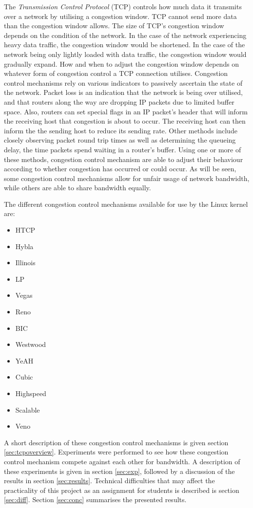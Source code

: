 \documentclass[11pt,a4paper,twocolumn]{article}
\begin{document}
The \textit{Transmission Control Protocol} (TCP) controls how much data it transmits over a network by utilising
a congestion window. TCP cannot send more data than the congestion window allows. The size of TCP's congestion
window depends on the condition of the network. In the case of the network experiencing heavy data traffic, the congestion window
would be shortened. In the case of the network being only lightly loaded with data traffic, the congestion window would
gradually expand. How and when to adjust the congestion window depends on whatever form of congestion control
a TCP connection utilises. Congestion control mechanisms rely on various indicators to passively ascertain the state of the network.
Packet loss is an indication that the network is being over utilised, and that routers along the way are dropping IP packets
due to limited buffer space. Also, routers can set special flags in an IP packet's header that will inform the receiving host
that congestion is about to occur. The receiving host can then inform the the sending host to reduce its sending rate.
Other methods include closely observing packet round trip times as well as determining the queueing delay, the time packets
spend waiting in a router's buffer.
Using one or more of these methods, congestion control mechanism are able to adjust their behaviour according to whether congestion
has occurred or could occur. As will be seen, some congestion control mechanisms allow for unfair usage of network bandwidth,
while others are able to share bandwidth equally.

The different congestion control mechanisms available for use by the Linux kernel are:
\begin{itemize}
\item HTCP
\item Hybla
\item Illinois
\item LP
\item Vegas
\item Reno
\item BIC
\item Westwood
\item YeAH
\item Cubic
\item Highspeed
\item Scalable
\item Veno
\end{itemize}
A short description of these congestion control mechanisms is given section \ref{sec:tcpoverview}. Experiments were
performed to see how these congestion control mechanism compete against each other for bandwidth. A description
of these experiments is given in section \ref{sec:exp}, followed by a discussion of the results in section \ref{sec:results}.
Technical difficulties that may affect the practicality of this project as an assignment for students is described
is section \ref{sec:diff}. Section \ref{sec:conc} summarises the presented results.
\end{document}
